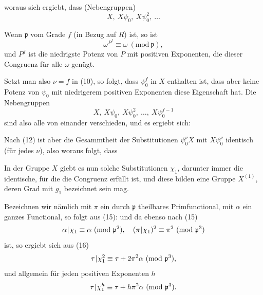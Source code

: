 woraus sich ergiebt, dass  (Nebengruppen)
\[ X,\ X\psi_0,\ X\psi_0^2,\ \ldots \]

Wenn $\mathfrak{p}$ vom Grade $f$ (in Bezug auf $R$) ist, so ist
\[ \omega^{P^f} \equiv \omega\ (\mathrm{mod}\ \mathfrak{p}), \]
und $P^f$ ist die niedrigste Potenz von $P$ mit positiven Exponenten, die dieser Congruenz für alle $\omega$ genügt.

Setzt man also $\nu = f$ in (10), so folgt, dass $\psi_0^f$ in $X$ enthalten ist, dass aber keine Potenz von $\psi_0$ mit niedrigerem positiven Exponenten diese Eigenschaft hat. Die Nebengruppen
\[ X,\ X\psi_0,\ X\psi_0^2,\ \ldots,\ X\psi_0^{f-1} \]
sind also alle von einander verschieden, und es ergiebt sich:

Nach (12) ist aber die Gesammtheit der Substitutionen $\psi_0^\nu X$ mit $X\psi_0^\nu$ identisch (für jedes $\nu$), also
woraus folgt, dass 


In der Gruppe $X$ giebt es nun solche Substitutionen $\chi_1$, darunter immer die identische, für die die Congruenz
erfüllt ist, und diese bilden eine Gruppe $X^{(1)}$, deren Grad mit $g_1$ bezeichnet sein mag.

 Bezeichnen wir nämlich mit $\pi$ ein durch $\mathfrak{p}$ theilbares Primfunctional, mit $\alpha$ ein ganzes Functional, so folgt aus (15):
und da ebenso nach (15)
\[ \alpha\mkern1mu|\mkern1mu\chi_1 \equiv \alpha\ (\mathrm{mod}\ \mathfrak{p}^2),\quad (\pi\mkern1mu|\mkern1mu\chi_1)^2 \equiv \pi^2\ (\mathrm{mod}\ \mathfrak{p}^3) \]
ist, so ergiebt sich aus (16)
\[ \tau\mkern1mu|\mkern1mu\chi_1^2 \equiv \tau + 2\pi^2\alpha\ (\mathrm{mod}\ \mathfrak{p}^3), \]
und allgemein für jeden positiven Exponenten $h$
\[ \tau\mkern1mu|\mkern1mu\chi_1^h \equiv \tau + h\pi^2\alpha\ (\mathrm{mod}\ \mathfrak{p}^3). \]
